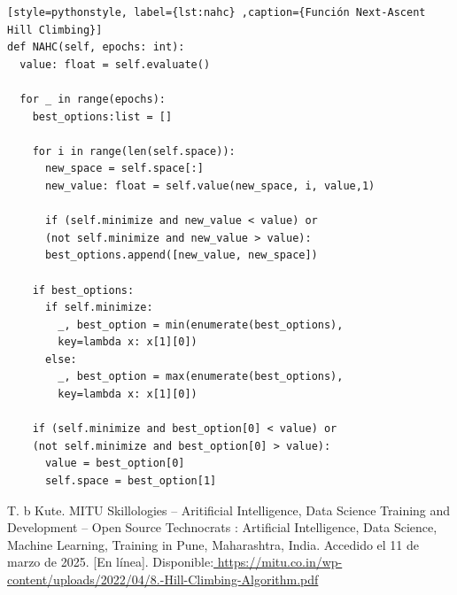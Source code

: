 \documentclass[12pt,twoside]{article}
\begin{document}
\begin{lstlisting}[style=pythonstyle, label={lst:nahc} ,caption={Función Next-Ascent Hill Climbing}]
def NAHC(self, epochs: int):
  value: float = self.evaluate()

  for _ in range(epochs):
    best_options:list = []

    for i in range(len(self.space)):
      new_space = self.space[:]
      new_value: float = self.value(new_space, i, value,1)

      if (self.minimize and new_value < value) or 
      (not self.minimize and new_value > value):
      best_options.append([new_value, new_space])

    if best_options: 
      if self.minimize:
        _, best_option = min(enumerate(best_options), 
        key=lambda x: x[1][0])
      else:    
        _, best_option = max(enumerate(best_options), 
        key=lambda x: x[1][0])

    if (self.minimize and best_option[0] < value) or 
    (not self.minimize and best_option[0] > value):
      value = best_option[0]  
      self.space = best_option[1]  
\end{lstlisting}

	\clearpage
{}
\begin{thebibliography}{99}
	T. b Kute. MITU Skillologies – Aritificial Intelligence, Data Science Training and Development – Open Source Technocrats : Artificial Intelligence, Data Science, Machine Learning, Training in Pune, Maharashtra, India. Accedido el 11 de marzo de 2025. [En línea]. Disponible:\url{ https://mitu.co.in/wp-content/uploads/2022/04/8.-Hill-Climbing-Algorithm.pdf}
\end{thebibliography}
\end{document}
